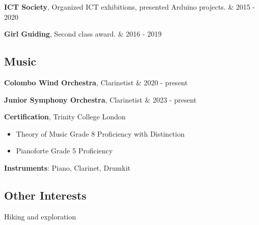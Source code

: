 \documentclass[10pt, a4paper]{article}
\newenvironment{highlights}{
        \begin{itemize}[
                topsep=0pt,
                parsep=0.10 cm,
                partopsep=0pt,
                itemsep=0pt,
                after=\vspace{-1\baselineskip},
                leftmargin=0.4 cm + 3pt
            ]
    }{
        \end{itemize}
    } %
\let\originalTabularx\tabularx
\let\originalEndTabularx\endtabularx
\renewenvironment{tabularx}{\bgroup\centering\originalTabularx}{\originalEndTabularx\par\egroup}
\begin{document}
           \vspace{0.2 cm}
		\begin{tabularx}{\textwidth-0.4 cm-0.13cm}{K{0.2 cm} R{4.1 cm}}
            \textbf{ICT Society}, Organized ICT exhibitions, presented Arduino projects. 
            &
            2015 - 2020
           \end{tabularx}
           
           \vspace{0.2 cm}
		\begin{tabularx}{\textwidth-0.4 cm-0.13cm}{K{0.2 cm} R{4.1 cm}}
            \textbf{Girl Guiding}, Second class award. 
            &
            2016 - 2019
           \end{tabularx}

\subsection{Music}
	\begin{tabularx}{\textwidth-0.4 cm-0.13cm}{K{0.2 cm} R{4.1 cm}}
            \textbf{Colombo Wind Orchestra}, Clarinetist
            &
            2020 - present
     \end{tabularx}
     \vspace{0.2 cm}
	\begin{tabularx}{\textwidth-0.4 cm-0.13cm}{K{0.2 cm} R{4.1 cm}}
            \textbf{Junior Symphony Orchestra}, Clarinetist
            &
            2023 - present
     \end{tabularx}
     
     \vspace{0.2 cm}
	\textbf{Certification}, Trinity College London
			\begin{highlights}
	       	 \item Theory of Music Grade 8 Proficiency with Distinction
			\item Pianoforte Grade 5 Proficiency
	        \end{highlights}
    \vspace{0.6 cm}
     \textbf{Instruments}: Piano, Clarinet, Drumkit
\subsection{Other Interests}
     Hiking and exploration
\end{document}
